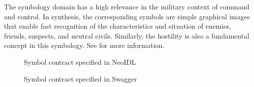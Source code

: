 \documentclass{ws-ijseke}
\newcommand{\neoidl}{NeoIDL}
\begin{document}
The symbology domain has a high relevance in the military 
context of command and control.
In synthesis, the corresponding symbols are simple graphical images 
that enable fast recognition
of the characteristics and situation of enemies, friends, suspects, 
and neutral civils. 
Similarly, the hostility is also a fundamental concept in this symbology. 
See \cite{app-6a} for more information.

\begin{figure}[htb]
\begin{scriptsize}

\vspace{-.5cm}
\end{scriptsize}
\caption{Symbol contract specified in \neoidl}
\label{lst:symbol-neo}
\end{figure} 

 
\begin{figure}[htb]
\begin{scriptsize}

\end{scriptsize}
\caption{Symbol contract specified in Swagger}
\label{lst:symbol-json}
\end{figure}



\end{document}
